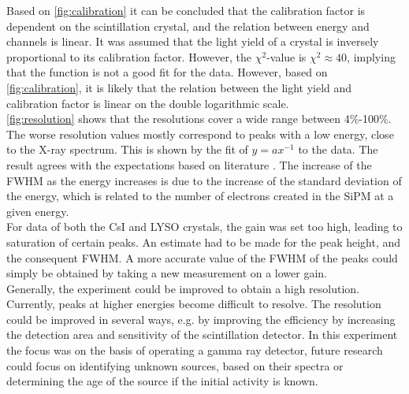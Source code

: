 \documentclass[a4paper, 11pt, table]{article}
\begin{document}
Based on \cref{fig:calibration} it can be concluded that the calibration factor is dependent on the scintillation crystal, and the relation between energy and channels is linear. It was assumed that the light yield of a crystal is inversely proportional to its calibration factor. However, the $\chi^2$-value is $\chi^2\approx40$, implying that the function is not a good fit for the data. However, based on \cref{fig:calibration}, it is likely that the relation between the light yield and calibration factor is linear on the double logarithmic scale.\\

\cref{fig:resolution} shows that the resolutions cover a wide range between 4\%-100\%. The worse resolution values mostly correspond to peaks with a low energy, close to the X-ray spectrum. This is shown by the fit of $y=ax^{-1}$ to the data. The result agrees with the expectations based on literature \cite{bloser_2013}. The increase of the FWHM as the energy increases is due to the increase of the standard deviation of the energy, which is related to the number of electrons created in the SiPM at a given energy.\\


For data of both the CsI and LYSO crystals, the gain was set too high, leading to saturation of certain peaks. An estimate had to be made for the peak height, and the consequent FWHM. A more accurate value of the FWHM of the peaks could simply be obtained by taking a new measurement on a lower gain.\\

Generally, the experiment could be improved to obtain a high resolution. Currently, peaks at higher energies become difficult to resolve. The resolution could be improved in several ways, e.g. by improving the efficiency by increasing the detection area and sensitivity of the scintillation detector. In this experiment the focus was on the basis of operating a gamma ray detector, future research could focus on identifying unknown sources, based on their spectra or determining the age of the source if the initial activity is known.
\end{document}
